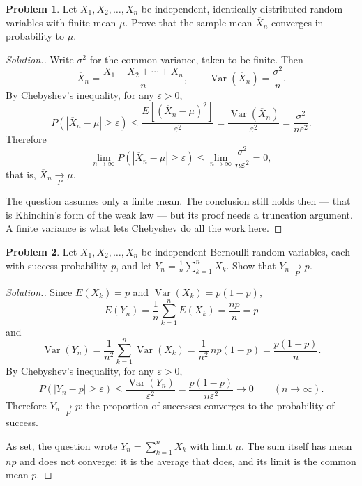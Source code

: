 \documentclass[11pt,a4paper]{article}
\theoremstyle{definition}
\newtheorem{problemx}{Problem}[subsection]
\newenvironment{problem}{\begin{problemx}}{\end{problemx}}
\newenvironment{solution}
  {\renewcommand{\qedsymbol}{}\begin{proof}[\textit{Solution}.]}
  {\end{proof}}
\DeclareMathOperator{\Var}{Var}
\begin{document}
\begin{problem}
Let $X_1,X_2,\dots,X_n$ be independent, identically distributed random
variables with finite mean $\mu$. Prove that the sample mean
$\overline{X}_n$ converges in probability to $\mu$.
\end{problem}
\begin{solution}
Write $\sigma^{2}$ for the common variance, taken to be finite. Then
$$\overline{X}_n = \frac{X_1+X_2+\cdots+X_n}{n},\qquad
\Var\left(\overline{X}_n\right) = \frac{\sigma^{2}}{n}.$$
By Chebyshev's inequality, for any $\varepsilon>0$,
$$P\left(\left|\overline{X}_n-\mu\right|\geq\varepsilon\right)
\leq\frac{E\left[\left(\overline{X}_n-\mu\right)^{2}\right]}{\varepsilon^{2}}
= \frac{\Var\left(\overline{X}_n\right)}{\varepsilon^{2}}
= \frac{\sigma^{2}}{n\varepsilon^{2}}.$$
Therefore
$$\lim_{n\rightarrow\infty}P\left(\left|\overline{X}_n-\mu\right|\geq\varepsilon\right)
\leq\lim_{n\rightarrow\infty}\frac{\sigma^{2}}{n\varepsilon^{2}} = 0 ,$$
that is, $\overline{X}_n\underset{P}{\longrightarrow}\mu$.

The question assumes only a finite mean. The conclusion still holds then ---
that is Khinchin's form of the weak law --- but its proof needs a truncation
argument. A finite variance is what lets Chebyshev do all the work here.
\end{solution}

\begin{problem}
Let $X_1,X_2,\dots,X_n$ be independent Bernoulli random variables, each
with success probability $p$, and let $Y_n = \frac1n\sum_{k=1}^{n}X_k$. Show that
$Y_n\underset{P}{\longrightarrow}p$.
\end{problem}
\begin{solution}
Since $E(X_k)=p$ and $\Var(X_k)=p(1-p)$,
$$E(Y_n) = \frac1n\sum_{k=1}^{n}E(X_k) = \frac{np}{n} = p$$
and
$$\Var(Y_n) = \frac{1}{n^{2}}\sum_{k=1}^{n}\Var(X_k)
= \frac{1}{n^{2}}\,np(1-p) = \frac{p(1-p)}{n}.$$
By Chebyshev's inequality, for any $\varepsilon>0$,
$$P\left(|Y_n-p|\geq\varepsilon\right)\leq\frac{\Var(Y_n)}{\varepsilon^{2}}
= \frac{p(1-p)}{n\varepsilon^{2}}\longrightarrow0\qquad(n\rightarrow\infty).$$
Therefore $Y_n\underset{P}{\longrightarrow}p$: the proportion of successes
converges to the probability of success.

As set, the question wrote $Y_n=\sum_{k=1}^{n}X_k$ with limit $\mu$. The sum
itself has mean $np$ and does not converge; it is the average that does, and its
limit is the common mean $p$.
\end{solution}
\end{document}
